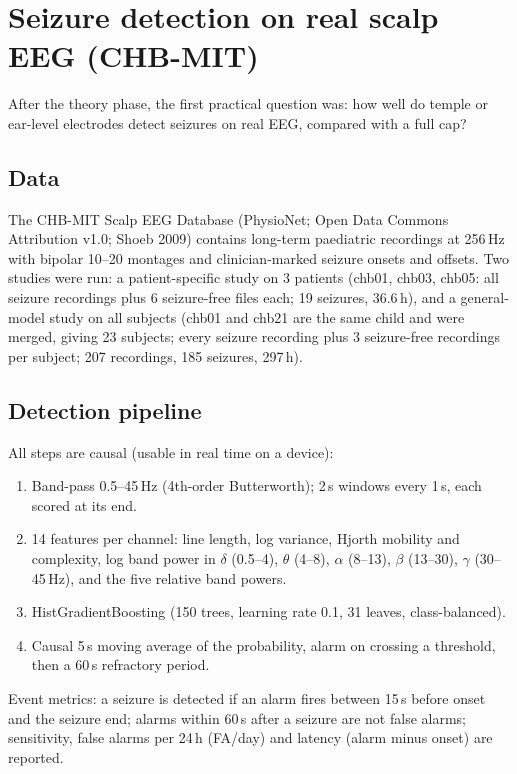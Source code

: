\section{Seizure detection on real scalp EEG (CHB-MIT)}
\label{sec:chbmit}

After the theory phase, the first practical question was: how well do temple or ear-level electrodes detect seizures on real EEG, compared with a full cap?

\subsection{Data}

The CHB-MIT Scalp EEG Database (PhysioNet; Open Data Commons Attribution v1.0; Shoeb 2009) contains long-term paediatric recordings at 256\,Hz with bipolar 10--20 montages and clinician-marked seizure onsets and offsets. Two studies were run: a patient-specific study on 3 patients (chb01, chb03, chb05: all seizure recordings plus 6 seizure-free files each; 19 seizures, 36.6\,h), and a general-model study on all subjects (chb01 and chb21 are the same child and were merged, giving 23 subjects; every seizure recording plus 3 seizure-free recordings per subject; 207 recordings, 185 seizures, 297\,h).

\subsection{Detection pipeline}

All steps are causal (usable in real time on a device):
\begin{enumerate}
\item Band-pass 0.5--45\,Hz (4th-order Butterworth); 2\,s windows every 1\,s, each scored at its end.
\item 14 features per channel: line length, log variance, Hjorth mobility and complexity, log band power in $\delta$ (0.5--4), $\theta$ (4--8), $\alpha$ (8--13), $\beta$ (13--30), $\gamma$ (30--45\,Hz), and the five relative band powers.
\item HistGradientBoosting (150 trees, learning rate 0.1, 31 leaves, class-balanced).
\item Causal 5\,s moving average of the probability, alarm on crossing a threshold, then a 60\,s refractory period.
\end{enumerate}
Event metrics: a seizure is detected if an alarm fires between 15\,s before onset and the seizure end; alarms within 60\,s after a seizure are not false alarms; sensitivity, false alarms per 24\,h (FA/day) and latency (alarm minus onset) are reported.

